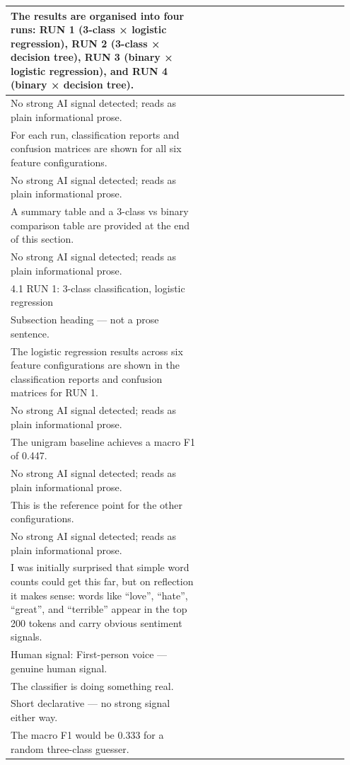 \documentclass[11pt]{article}
\begin{document}
\begin{longtable}{|p{0.55\linewidth}|p{0.40\linewidth}|}
\hline
The results are organised into four runs: RUN 1 (3-class × logistic regression), RUN 2 (3-class × decision tree), RUN 3 (binary × logistic regression), and RUN 4 (binary × decision tree). & \\[2pt]
\hline
No strong AI signal detected; reads as plain informational prose. & \\
\hline
For each run, classification reports and confusion matrices are shown for all six feature configurations. & \\[2pt]
\hline
No strong AI signal detected; reads as plain informational prose. & \\
\hline
A summary table and a 3-class vs binary comparison table are provided at the end of this section. & \\[2pt]
\hline
No strong AI signal detected; reads as plain informational prose. & \\
\hline
4.1 RUN 1: 3-class classification, logistic regression & \\[2pt]
\hline
Subsection heading --- not a prose sentence. & \\
\hline
The logistic regression results across six feature configurations are shown in the classification reports and confusion matrices for RUN 1. & \\[2pt]
\hline
No strong AI signal detected; reads as plain informational prose. & \\
\hline
The unigram baseline achieves a macro F1 of 0.447. & \\[2pt]
\hline
No strong AI signal detected; reads as plain informational prose. & \\
\hline
This is the reference point for the other configurations. & \\[2pt]
\hline
No strong AI signal detected; reads as plain informational prose. & \\
\hline
I was initially surprised that simple word counts could get this far, but on reflection it makes sense: words like ``love'', ``hate'', ``great'', and ``terrible'' appear in the top 200 tokens and carry obvious sentiment signals. & \\[2pt]
\hline
Human signal: First-person voice --- genuine human signal. & \\
\hline
The classifier is doing something real. & \\[2pt]
\hline
Short declarative --- no strong signal either way. & \\
\hline
The macro F1 would be 0.333 for a random three-class guesser. & \\[2pt]

\end{longtable}
\end{document}
